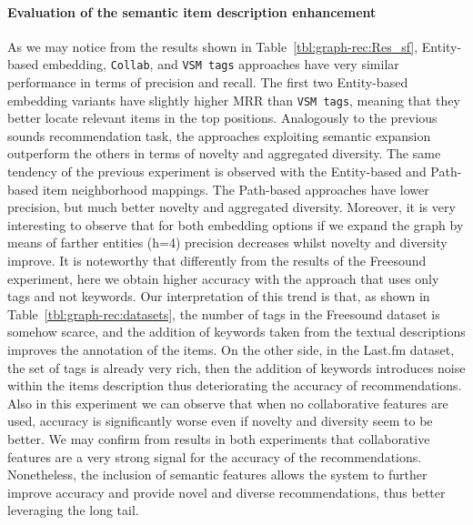 \paragraph*{\textbf{Evaluation of the semantic item description enhancement}}\label{sem_eval}
As we may notice from the results shown in Table~\ref{tbl:graph-rec:Res_sf}, Entity-based embedding, \texttt{Collab}, and \texttt{VSM tags} approaches have very similar performance in terms of precision and recall. The first two Entity-based embedding variants have slightly higher MRR than \texttt{VSM tags}, meaning that they better locate relevant items in the top positions. Analogously to the previous sounds recommendation task, the approaches exploiting semantic expansion outperform the others in terms of novelty and aggregated diversity. The same tendency of the previous experiment is observed with the Entity-based and Path-based item neighborhood mappings. The Path-based approaches have lower precision, but much better novelty and aggregated diversity. Moreover, it is very interesting to observe that for both embedding options if we expand the graph by means of farther entities (h=4) precision decreases whilst novelty and diversity improve. It is noteworthy that differently from the results of the Freesound experiment, here we obtain higher accuracy with the approach that uses only tags and not keywords. Our interpretation of this trend is that, as shown in Table~\ref{tbl:graph-rec:datasets}, the number of tags in the Freesound dataset is somehow scarce, and the addition of keywords taken from the textual descriptions improves the annotation of the items. On the other side, in the Last.fm dataset, the set of tags is already very rich, then the addition of keywords introduces noise within the items description thus deteriorating the accuracy of recommendations. 
Also in this experiment we can observe that when no collaborative features are used, accuracy is significantly worse even if novelty and diversity seem to be better. 
We may confirm from results in both experiments that collaborative features are a very strong signal for the accuracy of the recommendations. Nonetheless, the inclusion of semantic features allows the system to further improve accuracy and provide novel and diverse recommendations, thus better leveraging the long tail. %
